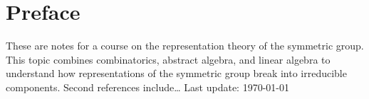 \documentclass[10pt,oneside,openany]{memoir}
\begin{document}
\chapter*{Preface}
\vspace{-35pt}
These are notes for a course on the representation theory of the symmetric group. This topic combines combinatorics, abstract algebra, and linear algebra to understand how representations of the symmetric group break into irreducible components. Second references include\ldots 
\vspace{-35pt}
\tableofcontents
\vfill
\specialdate
Last update: \today

%


\end{document}
